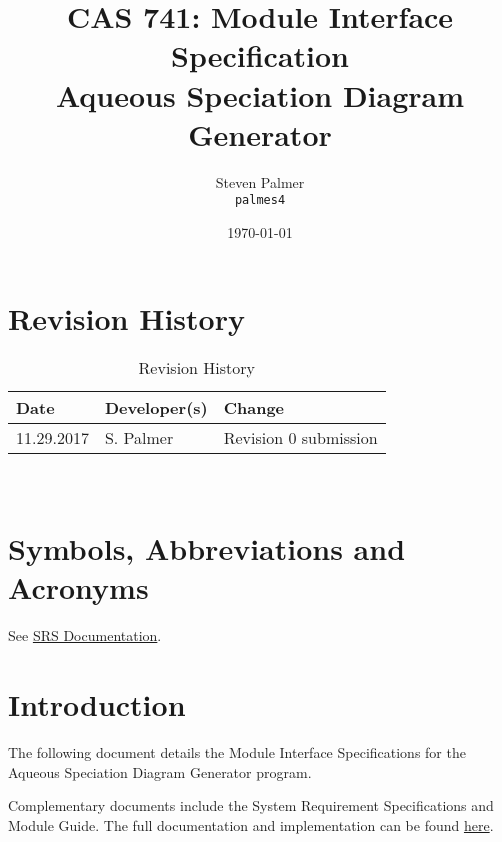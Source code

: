 \documentclass[12pt, titlepage]{article}
\begin{document}

\title{CAS 741: Module Interface Specification\\[10pt]\Large Aqueous Speciation Diagram Generator}
\author{Steven Palmer\\\texttt{palmes4}}
\date{\today}
	
\maketitle


\setcounter{secnumdepth}{0}

\section{Revision History}

\begin{table}[hp]
\caption{Revision History} \label{TblRevisionHistory}
\begin{tabularx}{\textwidth}{llX}
\toprule
\textbf{Date} & \textbf{Developer(s)} & \textbf{Change}\\
\midrule
11.29.2017 & S. Palmer & Revision 0 submission\\
\bottomrule
\end{tabularx}
\end{table}

~\newpage

\section{Symbols, Abbreviations and Acronyms}

See \href{https://github.com/palmerst/cas741_sp/blob/master/Doc/SRS/SRS.pdf}{SRS Documentation}.

\newpage

\tableofcontents


\newpage



\setcounter{secnumdepth}{3}

\section{Introduction}

The following document details the Module Interface Specifications for
the Aqueous Speciation Diagram Generator program.

Complementary documents include the System Requirement Specifications
and Module Guide.  The full documentation and implementation can be
found \href{https://github.com/palmerst/cas741_sp}{here}.
\end{document}
